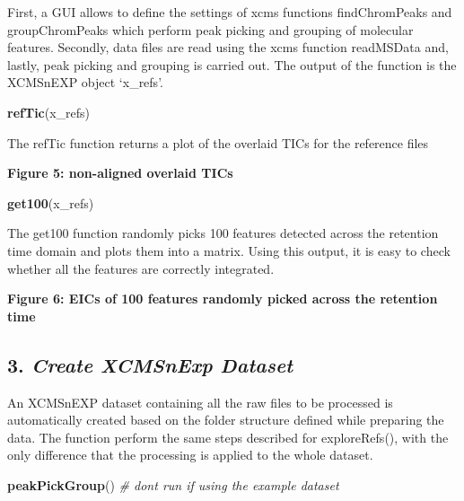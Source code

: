 \documentclass[
]{article}
\newenvironment{Shaded}{\begin{snugshade}}{\end{snugshade}}
\newcommand{\CommentTok}[1]{\textcolor[rgb]{0.56,0.35,0.01}{\textit{#1}}}
\newcommand{\KeywordTok}[1]{\textcolor[rgb]{0.13,0.29,0.53}{\textbf{#1}}}
\newcommand{\NormalTok}[1]{#1}
\begin{document}
First, a GUI allows to define the settings of xcms functions
findChromPeaks and groupChromPeaks which perform peak picking and
grouping of molecular features. Secondly, data files are read using the
xcms function readMSData and, lastly, peak picking and grouping is
carried out. The output of the function is the XCMSnEXP object
`x\_refs'.

\begin{Shaded}
\begin{Highlighting}[]
\KeywordTok{refTic}\NormalTok{(x\_refs)}
\end{Highlighting}
\end{Shaded}

The refTic function returns a plot of the overlaid TICs for the
reference files

\textbf{Figure 5: non-aligned overlaid TICs }

\begin{Shaded}
\begin{Highlighting}[]
\KeywordTok{get100}\NormalTok{(x\_refs)}
\end{Highlighting}
\end{Shaded}

The get100 function randomly picks 100 features detected across the
retention time domain and plots them into a matrix. Using this output,
it is easy to check whether all the features are correctly integrated.

\textbf{Figure 6: EICs of 100 features randomly picked across the
retention time}

\hypertarget{create-xcmsnexp-dataset}{%
\subsection{\texorpdfstring{3. \emph{Create XCMSnExp
Dataset}}{3. Create XCMSnExp Dataset}}\label{create-xcmsnexp-dataset}}

An XCMSnEXP dataset containing all the raw files to be processed is
automatically created based on the folder structure defined while
preparing the data. The function perform the same steps described for
exploreRefs(), with the only difference that the processing is applied
to the whole dataset.

\begin{Shaded}
\begin{Highlighting}[]
\KeywordTok{peakPickGroup}\NormalTok{() }\CommentTok{\# don\textquotesingle{}t run if using the example dataset}
\end{Highlighting}
\end{Shaded}
\end{document}
